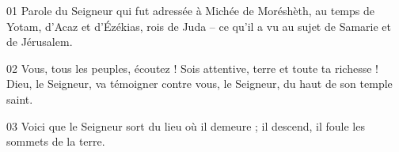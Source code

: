 01 Parole du Seigneur qui fut adressée à Michée de Moréshèth, au temps de Yotam, d’Acaz et d’Ézékias, rois de Juda – ce qu’il a vu au sujet de Samarie et de Jérusalem.

02 Vous, tous les peuples, écoutez ! Sois attentive, terre et toute ta richesse ! Dieu, le Seigneur, va témoigner contre vous, le Seigneur, du haut de son temple saint.

03 Voici que le Seigneur sort du lieu où il demeure ; il descend, il foule les sommets de la terre.

